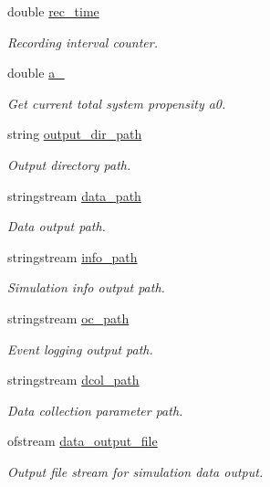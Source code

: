 \begin{DoxyCompactItemize}
double \hyperlink{classnw_1_1_gillespie___sys_a2209a66c1cd88b06fb8a0e8b41d72b29}{rec\+\_\+time}
\begin{DoxyCompactList}\small\item\em Recording interval counter. \end{DoxyCompactList}\item 
double \hyperlink{classnw_1_1_gillespie___sys_a72cfc8f0044d7f2130f834aba5e22e18}{a\+\_}
\begin{DoxyCompactList}\small\item\em Get current total system propensity a0. \end{DoxyCompactList}\item 
string \hyperlink{classnw_1_1_gillespie___sys_a07aa57de819107467a13af8ceadb4be9}{output\+\_\+dir\+\_\+path}
\begin{DoxyCompactList}\small\item\em Output directory path. \end{DoxyCompactList}\item 
stringstream \hyperlink{classnw_1_1_gillespie___sys_a989a4288ca9dd4eaf9a5ef45c805260e}{data\+\_\+path}
\begin{DoxyCompactList}\small\item\em Data output path. \end{DoxyCompactList}\item 
stringstream \hyperlink{classnw_1_1_gillespie___sys_a24b051d05da3cc35a983536371522e2c}{info\+\_\+path}
\begin{DoxyCompactList}\small\item\em Simulation info output path. \end{DoxyCompactList}\item 
stringstream \hyperlink{classnw_1_1_gillespie___sys_ab1709cadc7e452ec3834ac66a3354203}{oc\+\_\+path}
\begin{DoxyCompactList}\small\item\em Event logging output path. \end{DoxyCompactList}\item 
stringstream \hyperlink{classnw_1_1_gillespie___sys_a0d0bfd2a96ed9314b0189791d941fded}{dcol\+\_\+path}
\begin{DoxyCompactList}\small\item\em Data collection parameter path. \end{DoxyCompactList}\item 
ofstream \hyperlink{classnw_1_1_gillespie___sys_aec438472b938a410f0d31af0ae73a164}{data\+\_\+output\+\_\+file}
\begin{DoxyCompactList}\small\item\em Output file stream for simulation data output. \end{DoxyCompactList}\item 

\end{DoxyCompactItemize}
